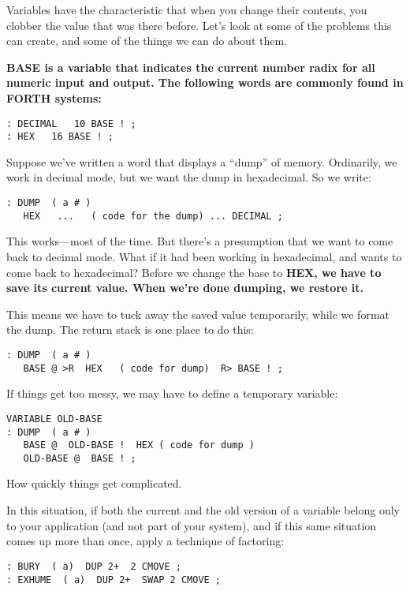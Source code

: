 Variables have the characteristic that when you change their contents,
you clobber the value that was there before. Let's look at some of the
problems this can create, and some of the things we can do about them.

\bf{BASE} is a variable that indicates the current number radix for all
numeric input and output. The following words are commonly found in
FORTH systems:

\begin{verbatim}
: DECIMAL   10 BASE ! ;
: HEX   16 BASE ! ;
\end{verbatim}

Suppose we've written a word that displays a ``dump'' of memory. Ordinarily,
we work in decimal mode, but we want the dump in hexadecimal. So we write:

\begin{verbatim}
: DUMP  ( a # )
   HEX   ...   ( code for the dump) ... DECIMAL ;
\end{verbatim}

This works---most of the time. But there's a presumption that we want to
come back to decimal mode. What if it had been working in hexadecimal,
and wants to come back to hexadecimal? Before we change the base to
\bf{HEX}, we have to save its current value. When we're done dumping, we
restore it.

This means we have to tuck away the saved value temporarily,
while we format the dump. The return stack is one place to do this:

\begin{verbatim}
: DUMP  ( a # )
   BASE @ >R  HEX   ( code for dump)  R> BASE ! ;
\end{verbatim}

If things get too messy, we may have to define a temporary variable:

\begin{verbatim}
VARIABLE OLD-BASE
: DUMP  ( a # )
   BASE @  OLD-BASE !  HEX ( code for dump )
   OLD-BASE @  BASE ! ;
\end{verbatim}

How quickly things get complicated.

In this situation, if both the current and the old version of a variable
belong only to your application (and not part of your system), and if this
same situation comes up more than once, apply a technique of factoring:

\begin{verbatim}
: BURY  ( a)  DUP 2+  2 CMOVE ;
: EXHUME  ( a)  DUP 2+  SWAP 2 CMOVE ;
\end{verbatim}


